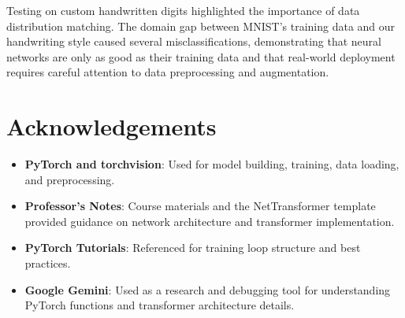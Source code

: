 \documentclass[11pt]{article}
\begin{document}
Testing on custom handwritten digits highlighted the importance of data distribution matching. The domain gap between MNIST's training data and our handwriting style caused several misclassifications, demonstrating that neural networks are only as good as their training data and that real-world deployment requires careful attention to data preprocessing and augmentation.

\section{Acknowledgements}

\begin{itemize}
    \item \textbf{PyTorch and torchvision}: Used for model building, training, data loading, and preprocessing.
    \item \textbf{Professor's Notes}: Course materials and the NetTransformer template provided guidance on network architecture and transformer implementation.
    \item \textbf{PyTorch Tutorials}: Referenced for training loop structure and best practices.
    \item \textbf{Google Gemini}: Used as a research and debugging tool for understanding PyTorch functions and transformer architecture details.
\end{itemize}
\end{document}
